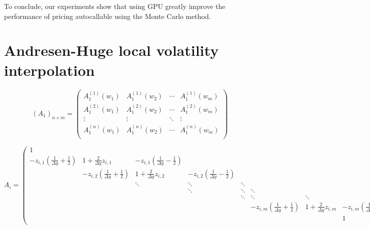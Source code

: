 \medskip

To conclude, our experiments show that using GPU greatly improve the
performance of pricing autocallable using the Monte Carlo method.



\section{Andresen-Huge local volatility interpolation}

\begin{equation}
  (A_1)_{n\times m} = 
    \begin{pmatrix}
      A_1^{(1)}(w_1) & A_1^{(1)}(w_2) & \cdots & A_1^{(1)}(w_m) \\
      A_1^{(2)}(w_1) & A_1^{(2)}(w_2) & \cdots & A_1^{(2)}(w_m) \\
      \vdots         & \vdots         & \ddots & \vdots         \\
      A_1^{(n)}(w_1) & A_1^{(n)}(w_2) & \cdots & A_1^{(n)}(w_m) \\
    \end{pmatrix}
\end{equation}


\begin{equation}
  A_i = 
    \begin{pmatrix}
      1 & & & & & & & \\
      -z_{i,1}(\frac{1}{\Delta y}+\frac{1}{2}) & 1+\frac{2}{\Delta y} z_{i,1} & -z_{i,1}(\frac{1}{\Delta y}-\frac{1}{2}) & & & & & \\
       & -z_{i,2}(\frac{1}{\Delta y}+\frac{1}{2}) & 1+\frac{2}{\Delta y} z_{i,2} & -z_{i,2}(\frac{1}{\Delta y}-\frac{1}{2}) & & & & \\
       & & \ddots & \ddots & \ddots & & & & \\
       & & & \ddots & \ddots & \ddots & & &  \\
       & & & & \ddots & \ddots & \ddots & &  \\
       & & & & & -z_{i,m}(\frac{1}{\Delta y}+\frac{1}{2}) & 1+\frac{2}{\Delta y}z_{i,m} & -z_{i,m}(\frac{1}{\Delta y}-\frac{1}{2}) \\
       & & & & & & & 1 \\
    \end{pmatrix}
\end{equation}


